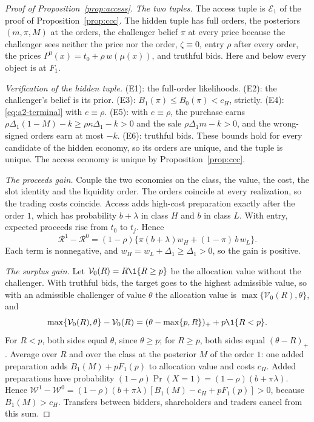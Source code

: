 \begin{proof}[Proof of Proposition~\ref{prop:access}]
\emph{The two tuples.} The access tuple is \(\mathcal E_1\) of the proof of Proposition~\ref{prop:ccc}. The hidden
tuple has full orders, the posteriors \((m,\pi,M)\) at the orders, the challenger belief \(\pi\) at every price
because the challenger sees neither the price nor the order, \(\zeta\equiv0\), entry \(\rho\) after every order, the
prices \(P^0(x)=t_0+\rho\,w(\mu(x))\), and truthful bids. Here and below every object is at \(F_1\).

\emph{Verification of the hidden tuple.} (E1): the full-order likelihoods. (E2): the challenger's belief is its
prior. (E3): \(B_1(\pi)\le B_0(\pi)<c_H\), strictly. (E4): \eqref{eq:a2-terminal} with \(e\equiv\rho\). (E5): with
\(e\equiv\rho\), the purchase earns \(\rho\Delta_1(1-M)-k\ge\rho\kappa\Delta_1-k>0\) and the sale
\(\rho\Delta_1m-k>0\), and the wrong-signed orders earn at most \(-k\). (E6): truthful bids. These bounds hold for
every candidate of the hidden economy, so its orders are unique, and the tuple is unique. The access economy is
unique by Proposition~\ref{prop:ccc}.

\emph{The proceeds gain.} Couple the two economies on the class, the value, the cost, the slot identity and the
liquidity order. The orders coincide at every realization, so the trading costs coincide. Access adds high-cost
preparation exactly after the order \(1\), which has probability \(b+\lambda\) in class \(H\) and \(b\) in class
\(L\). With entry, expected proceeds rise from \(t_0\) to \(t_j\). Hence
\[
\mathcal R^1-\mathcal R^0=(1-\rho)\{\pi(b+\lambda)w_H+(1-\pi)\,b\,w_L\}.
\]
Each term is nonnegative, and \(w_H=w_L+\Delta_1\ge\Delta_1>0\), so the gain is positive.

\emph{The surplus gain.} Let \(\mathcal V_0(R)=R\1\{R\ge p\}\) be the allocation value without the challenger.
With truthful bids, the target goes to the highest admissible value, so with an admissible challenger of value
\(\theta\) the allocation value is \(\max\{\mathcal V_0(R),\theta\}\), and
\begin{equation}\label{eq:a7-welfare}
\max\{\mathcal V_0(R),\theta\}-\mathcal V_0(R)=(\theta-\max\{p,R\})_++p\1\{R<p\}.
\end{equation}
For \(R<p\), both sides equal \(\theta\), since \(\theta\ge p\); for \(R\ge p\), both sides equal \((\theta-R)_+\).
Average over \(R\) and over the class at the posterior \(M\) of the order \(1\): one added preparation adds
\(B_1(M)+pF_1(p)\) to allocation value and costs \(c_H\). Added preparations have probability
\((1-\rho)\Pr(X=1)=(1-\rho)(b+\pi\lambda)\). Hence
\(\mathcal W^1-\mathcal W^0=(1-\rho)(b+\pi\lambda)[B_1(M)-c_H+pF_1(p)]>0\), because \(B_1(M)>c_H\). Transfers between
bidders, shareholders and traders cancel from this sum.
\end{proof}


